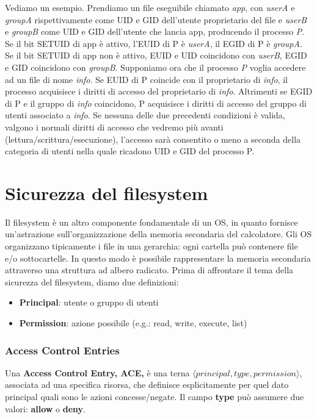 Vediamo un esempio. Prendiamo un file eseguibile chiamato \textit{app}, con \textit{userA} e \textit{groupA} rispettivamente come UID e GID dell'utente proprietario del file e \textit{userB} e \textit{groupB} come UID e GID dell'utente che lancia app, producendo il processo \textit{P}. Se il bit SETUID di app è attivo, l'EUID di P è \textit{userA}, il EGID di P è \textit{groupA}. Se il bit SETUID di app non è attivo, EUID e UID coincidono con \textit{userB}, EGID e GID coincidono con \textit{groupB}. Supponiamo ora che il processo \textit{P} voglia accedere ad un file di nome \textit{info}. Se EUID di P coincide con il proprietario di \textit{info}, il processo acquisisce i diritti di accesso del proprietario di \textit{info}. Altrimenti se EGID di P e il gruppo di \textit{info} coincidono, P acquisisce i diritti di accesso del gruppo di utenti associato a \textit{info}. Se nessuna delle due precedenti condizioni è valida, valgono i normali diritti di accesso che vedremo più avanti (lettura/scrittura/esecuzione), l'accesso sarà consentito o meno a seconda della categoria di utenti nella quale ricadono UID e GID del processo P.

\section{Sicurezza del filesystem}
Il filesystem è un altro componente fondamentale di un OS, in quanto fornisce un'astrazione sull'organizzazione della memoria secondaria del calcolatore. Gli OS organizzano tipicamente i file in una gerarchia: ogni cartella può contenere file e/o sottocartelle. In questo modo è possibile rappresentare la memoria secondaria attraverso una struttura ad albero radicato. Prima di affrontare il tema della sicurezza del filesystem, diamo due definizioni:
\begin{itemize}
  \item \textbf{Principal}: utente o gruppo di utenti
  \item \textbf{Permission}: azione possibile (e.g.: read, write, execute, list)
\end{itemize}

\subsubsection{Access Control Entries}
Una \textbf{Access Control Entry, ACE,} è una terna $\langle principal, type, permission \rangle$, associata ad una specifica risorsa, che definisce esplicitamente per quel dato principal quali sono le azioni concesse/negate. Il campo \textbf{type} può assumere due valori: \textbf{allow} o \textbf{deny}. \newline 

